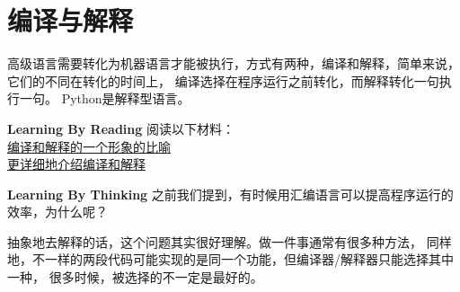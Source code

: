 \section{编译与解释}
高级语言需要转化为机器语言才能被执行，方式有两种，编译和解释，简单来说，它们的不同在转化的时间上，
编译选择在程序运行之前转化，而解释转化一句执行一句。
Python是解释型语言。
\begin{paperbox}{\textbf{Learning By Reading}\starthree}
阅读以下材料：\\
\href{https://www.zhihu.com/question/21486706/answer/32975999}{编译和解释的一个形象的比喻}\\
\href{http://alexyyek.github.io/2015/01/08/CompileAndInterpreter/}{更详细地介绍编译和解释}
\end{paperbox}
\begin{paperbox}{\textbf{Learning By Thinking}\starthree}
之前我们提到，有时候用汇编语言可以提高程序运行的效率，为什么呢？
\end{paperbox}
抽象地去解释的话，这个问题其实很好理解。做一件事通常有很多种方法，
同样地，不一样的两段代码可能实现的是同一个功能，但编译器/解释器只能选择其中一种，
很多时候，被选择的不一定是最好的。
